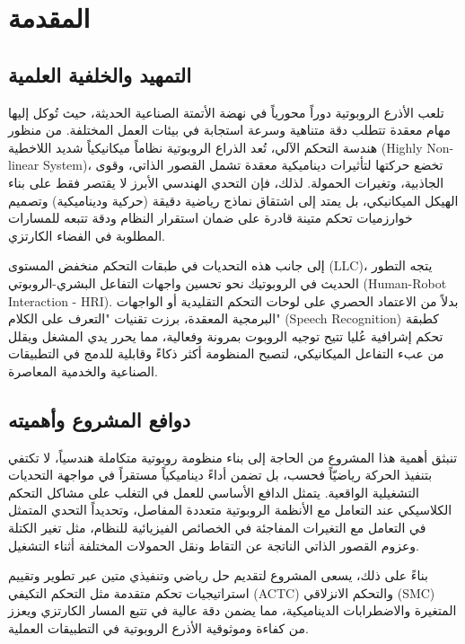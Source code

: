 \chapter{المقدمة}

\section{التمهيد والخلفية العلمية}
تلعب الأذرع الروبوتية دوراً محورياً في نهضة الأتمتة الصناعية الحديثة، حيث تُوكل إليها مهام معقدة تتطلب دقة متناهية وسرعة استجابة في بيئات العمل المختلفة. من منظور هندسة التحكم الآلي، تُعد الذراع الروبوتية نظاماً ميكانيكياً شديد اللاخطية (\textenglish{Highly Non-linear System})، تخضع حركتها لتأثيرات ديناميكية معقدة تشمل القصور الذاتي، وقوى الجاذبية، وتغيرات الحمولة. لذلك، فإن التحدي الهندسي الأبرز لا يقتصر فقط على بناء الهيكل الميكانيكي، بل يمتد إلى اشتقاق نماذج رياضية دقيقة (حركية وديناميكية) وتصميم خوارزميات تحكم متينة قادرة على ضمان استقرار النظام ودقة تتبعه للمسارات المطلوبة في الفضاء الكارتزي.

إلى جانب هذه التحديات في طبقات التحكم منخفض المستوى (\textenglish{LLC})، يتجه التطور الحديث في الروبوتيك نحو تحسين واجهات التفاعل البشري-الروبوتي (\textenglish{Human-Robot Interaction - HRI}). بدلاً من الاعتماد الحصري على لوحات التحكم التقليدية أو الواجهات البرمجية المعقدة، برزت تقنيات "التعرف على الكلام" (\textenglish{Speech Recognition}) كطبقة تحكم إشرافية عُليا تتيح توجيه الروبوت بمرونة وفعالية، مما يحرر يدي المشغل ويقلل من عبء التفاعل الميكانيكي، لتصبح المنظومة أكثر ذكاءً وقابلية للدمج في التطبيقات الصناعية والخدمية المعاصرة.

\section{دوافع المشروع وأهميته}
تنبثق أهمية هذا المشروع من الحاجة إلى بناء منظومة روبوتية متكاملة هندسياً، لا تكتفي بتنفيذ الحركة رياضيّاً فحسب، بل تضمن أداءً ديناميكياً مستقراً في مواجهة التحديات التشغيلية الواقعية. يتمثل الدافع الأساسي للعمل في التغلب على مشاكل التحكم الكلاسيكي عند التعامل مع الأنظمة الروبوتية متعددة المفاصل، وتحديداً التحدي المتمثل في التعامل مع التغيرات المفاجئة في الخصائص الفيزيائية للنظام، مثل تغير الكتلة وعزوم القصور الذاتي الناتجة عن التقاط ونقل الحمولات المختلفة أثناء التشغيل.

بناءً على ذلك، يسعى المشروع لتقديم حل رياضي وتنفيذي متين عبر تطوير وتقييم استراتيجيات تحكم متقدمة مثل التحكم التكيفي (\textenglish{ACTC}) والتحكم الانزلاقي (\textenglish{SMC}) المتغيرة والاضطرابات الديناميكية، مما يضمن دقة عالية في تتبع المسار الكارتزي ويعزز من كفاءة وموثوقية الأذرع الروبوتية في التطبيقات العملية.
